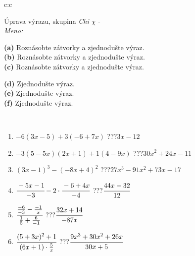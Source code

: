 \documentclass[10pt]{report}
\begin{document}
\newpage
\thispagestyle{empty}
\begin{tabular}{c:c}
\begin{minipage}[c][104.5mm][t]{0.5\linewidth}
\begin{center}
\vspace{7mm}
{\huge Úprava výrazu, skupina \textit{Chi $\chi$} -}\\[5mm]
\textit{Meno:}\phantom{xxxxxxxxxxxxxxxxxxxxxxxxxxxxxxxxxxxxxxxxxxxxxxxxxxxxxxxxxxxxxxxxx}\\[5mm]
\begin{minipage}{0.95\linewidth}
\begin{center}
{\small \begin{minipage}{0.6\textwidth}
\textbf{(a)} Roznásobte zátvorky a zjednodušte výraz. \\[1mm]
\textbf{(b)} Roznásobte zátvorky a zjednodušte výraz. \\[1mm]
\textbf{(c)} Roznásobte zátvorky a zjednodušte výraz.
\end{minipage} \begin{minipage}{0.39\textwidth}
\textbf{(d)} Zjednodušte výraz. \\[1mm]
\textbf{(e)} Zjednodušte výraz. \\[1mm]
\textbf{(f)} Zjednodušte výraz.
\end{minipage}
}
\end{center}
\end{minipage}
\\[4mm]
\begin{minipage}{0.79\linewidth}
\begin{center}
\begin{varwidth}{\linewidth}
\begin{enumerate}
\normalsize
\item $-6(3x-5)+3(-6+7x)$\quad \dotfill\; ???\;\dotfill \quad $3x-12$
\item $-3(5-5x)(2x+1)+1(4-9x)$\quad \dotfill\; ???\;\dotfill \quad $30x^2+24x-11$
\item $(3x-1)^3-(-8x+4)^2$\quad \dotfill\; ???\;\dotfill \quad $27x^3-91x^2+73x-17$
\item $\cfrac{-5x-1}{-3}-2\cdot\cfrac{-6+4x}{-4}$\quad \dotfill\; ???\;\dotfill \quad $\cfrac{44x-32}{12}$
\item $\cfrac{\frac{-6}{-3}-\frac{-1}{x}}{\frac{1}{5}+\frac{6}{-1}}$\quad \dotfill\; ???\;\dotfill \quad $\cfrac{32x+14}{-87x}$
\item $\cfrac{(5+3x)^2+1}{(6x+1)\cdot\frac{5}{x}}$\quad \dotfill\; ???\;\dotfill \quad $\cfrac{9x^3+30x^2+26x}{30x+5}$

\end{enumerate}
\end{varwidth}
\end{center}
\end{minipage}
\end{center}
\end{minipage}
\end{tabular}
\end{document}
